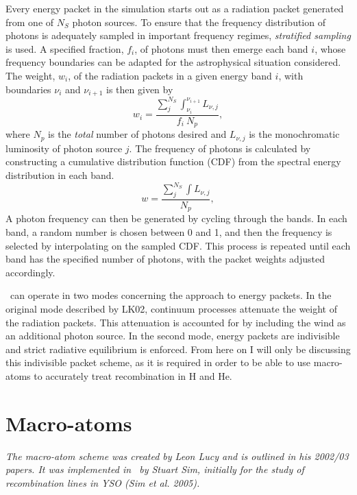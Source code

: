 Every energy packet in the simulation starts out as a radiation packet generated
from one of $N_S$ photon sources. To ensure that the frequency distribution
of photons is adequately sampled in important frequency regimes, 
{\em stratified sampling} is used. A specified fraction, $f_i$,
of photons must then emerge each band $i$, whose frequency boundaries
can be adapted for the astrophysical situation considered. 
The weight, $w_i$, of the radiation packets in a given energy band $i$, with boundaries
$\nu_i$ and $\nu_{i+1}$ is then given by
\begin{equation}
w_i = \frac{\sum_j^{N_S} \int_{\nu_i}^{\nu_{i+1}} L_{\nu,j}}{f_i~N_p},
\end{equation}
where $N_p$ is the {\em total} number of photons desired 
and $L_{\nu,j}$ is the monochromatic 
luminosity of photon source $j$. 
The frequency of photons is 
calculated by constructing a cumulative distribution function (CDF) from the
spectral energy distribution in each band.  
\begin{equation}
w = \frac{\sum_j^{N_S} \int L_{\nu,j}}{N_p},
\end{equation}
A photon frequency can then be generated by cycling through the bands. In each band,
a random number is chosen between 0 and 1, and then the frequency is 
selected by interpolating on the sampled CDF. This process is repeated until 
each band has the specified number of photons, with the packet
weights adjusted accordingly.

\py\ can operate in two modes concerning the approach to energy packets. 
In the original mode described by LK02, continuum processes attenuate 
the weight of the radiation packets. This attenuation is accounted for 
by including the wind as an additional photon source.
In the second mode, energy packets are indivisible and strict radiative equilibrium is
enforced. From here on I will only be discussing this indivisible packet scheme, 
as it is required in order to be able to use macro-atoms to accurately
treat recombination in H and He.

\section{Macro-atoms}

{\sl The macro-atom scheme was created by Leon Lucy and is outlined in 
his 2002/03 papers. It was implemented in \py\ by Stuart Sim, initially
for the study of recombination lines in YSO (Sim et al. 2005).}


